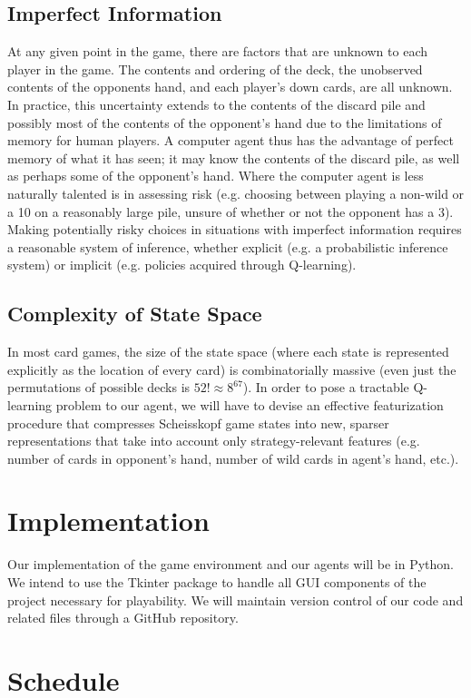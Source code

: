 \documentclass[paper=a4, fontsize=11pt]{scrartcl}
\numberwithin{equation}{section}		%
\numberwithin{figure}{section}			%
\numberwithin{table}{section}				%
\begin{document}
\subsection{Imperfect Information}
At any given point in the game, there are factors that are unknown to each player in the game. The contents and ordering of the deck, the unobserved contents of the opponents hand, and each player's down cards, are all unknown. In practice, this uncertainty extends to the contents of the discard pile and possibly most of the contents of the opponent's hand due to the limitations of memory for human players. A computer agent thus has the advantage of perfect memory of what it has seen; it may know the contents of the discard pile, as well as perhaps some of the opponent's hand. Where the computer agent is less naturally talented is in assessing risk (e.g. choosing between playing a non-wild or a 10 on a reasonably large pile, unsure of whether or not the opponent has a 3). Making potentially risky choices in situations with imperfect information requires a reasonable system of inference, whether explicit (e.g. a probabilistic inference system) or implicit (e.g. policies acquired through Q-learning).

\subsection{Complexity of State Space}
In most card games, the size of the state space (where each state is represented explicitly as the location of every card) is combinatorially massive (even just the permutations of possible decks is $52! \approx 8^{67}$). In order to pose a tractable Q-learning problem to our agent, we will have to devise an effective featurization procedure that compresses Scheisskopf game states into new, sparser representations that take into account only strategy-relevant features (e.g. number of cards in opponent's hand, number of wild cards in agent's hand, etc.).

\section{Implementation}

Our implementation of the game environment and our agents will be in Python. We intend to use the Tkinter package to handle all GUI components of the project necessary for playability. We will maintain version control of our code and related files through a GitHub repository.

\section{Schedule}
\end{document}
